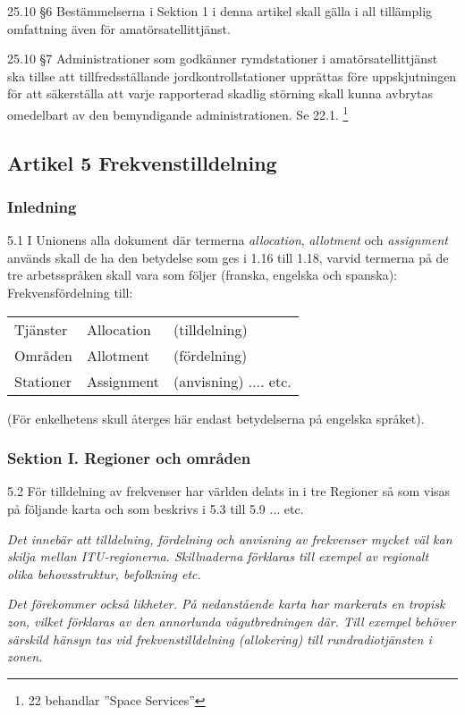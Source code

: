 25.10 \S6 Bestämmelserna i Sektion 1 i denna artikel skall gälla i all
tillämplig omfattning även för amatörsatellittjänst.
\cite[25.10]{ITU-RR}

25.10 \S7 Administrationer som godkänner rymdstationer i amatörsatellittjänst
ska tillse att tillfredsställande jordkontrollstationer upprättas före
uppskjutningen för att säkerställa att varje rapporterad skadlig störning
skall kunna avbrytas omedelbart av den bemyndigande administrationen.
Se 22.1. \cite[25.11]{ITU-RR}\footnote{22 behandlar ''Space Services''}

\subsection{Artikel 5 Frekvenstilldelning}

\subsubsection{Inledning}

5.1 I Unionens alla dokument där termerna \emph{allocation},
\emph{allotment} och \emph{assignment} används skall de ha den
betydelse som ges i 1.16 till 1.18, varvid termerna på de tre
arbetsspråken skall vara som följer (franska, engelska och spanska):
\cite[5.1]{ITU-RR}
Frekvensfördelning till:

\begin{center}
\begin{tabular}{lll}
  Tjänster & Allocation & (tilldelning) \\
  Områden & Allotment & (fördelning) \\
  Stationer & Assignment & (anvisning) .... etc. \\
\end{tabular}
\end{center}

(För enkelhetens skull återges här endast betydelserna på engelska språket).

\subsubsection{Sektion I. Regioner och områden}

5.2 För tilldelning av frekvenser har världen delats in i tre
Regioner så som visas på följande karta och som beskrivs i 5.3 till
5.9 ... etc.
\cite[5.2]{ITU-RR}

\emph{ Det innebär att tilldelning, fördelning och anvisning av frekvenser
  mycket väl kan skilja mellan ITU-regionerna.
  Skillnaderna förklaras till exempel av regionalt olika behovsstruktur, befolkning
  etc.}

\emph{Det förekommer också likheter.
  På nedanstående karta har markerats en tropisk zon, vilket förklaras av den
  annorlunda vågutbredningen där.
  Till exempel behöver särskild hänsyn tas vid frekvenstilldelning (allokering) till
  rundradiotjänsten i zonen.}

